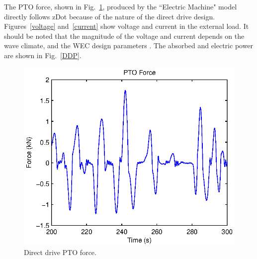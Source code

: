 \documentclass[twocolumn,10pt]{asme2e}
\begin{document}



The PTO force, shown in Fig.~\ref{DD_Fpto}, produced by the ``Electric Machine" model directly follows zDot because of the nature of the direct drive design. Figures~\ref{voltage} and~\ref{current} show voltage and current in the external load. It should be noted that the magnitude of the voltage and current depends on the wave climate, and the WEC design parameters \cite{prudell2009novel}.  The absorbed and electric power are shown in Fig.~\ref{DDP}. 

\begin{figure}[t]
    \centering
    \includegraphics[width=1\columnwidth]{Images/DDFpto}
    \caption{Direct drive PTO force.}
    \label{DD_Fpto}
    \end{figure}
\end{document}
